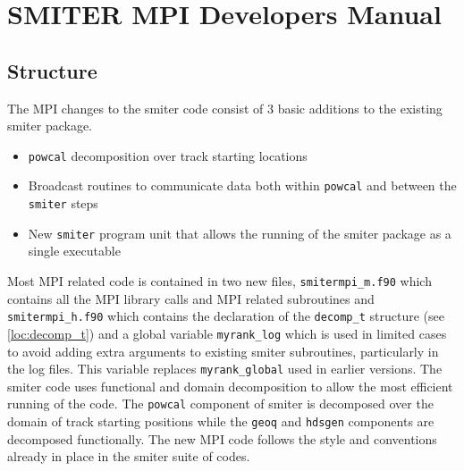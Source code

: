 \section{SMITER MPI Developers Manual}
\label{loc:smiterDevMan}

\subsection{Structure}
The MPI changes to the smiter code consist of 3 basic additions to the existing smiter package.

\begin{itemize}
\item {\tt powcal} decomposition over track starting locations
\item Broadcast routines to communicate data both within {\tt powcal} and between the {\tt smiter} steps
\item New {\tt smiter} program unit that allows the running of the smiter package as a single executable
\end{itemize}

Most MPI related code is contained in two new files, {\tt smitermpi\_m.f90} which contains all the MPI library calls and MPI related subroutines and {\tt smitermpi\_h.f90} which contains the declaration of the {\tt decomp\_t} structure (see \ref{loc:decomp_t}) and a global variable {\tt myrank\_log} which is used in limited cases to avoid adding extra arguments to existing smiter subroutines, particularly in the log files. This variable replaces {\tt myrank\_global} used in earlier versions. The smiter code uses functional and domain decomposition to allow the most efficient running of the code. The {\tt powcal} component of smiter is decomposed over the domain of track starting positions while the {\tt geoq} and {\tt hdsgen} components are decomposed functionally. The new MPI code follows the style and conventions already in place in the smiter suite of codes.

